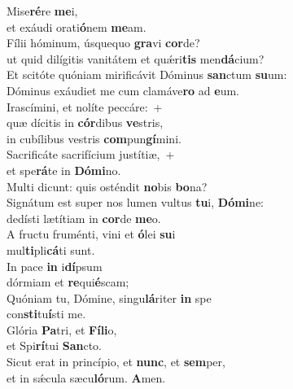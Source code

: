 \evenverse Mise\textbf{ré}re \textbf{me}i,~\*\\
\evenverse et exáudi orati\textbf{ó}nem \textbf{me}am.\\
\oddverse Fílii hóminum, úsquequo \textbf{gra}vi \textbf{cor}de?~\*\\
\oddverse ut quid dilígitis vanitátem et quǽri\textbf{tis} men\textbf{dá}cium?\\
\evenverse Et scitóte quóniam mirificávit Dóminus \textbf{san}ctum \textbf{su}um:~\*\\
\evenverse Dóminus exáudiet me cum clamáve\textbf{ro} ad \textbf{e}um.\\
\oddverse Irascímini, et nolíte peccáre:~+\\
\oddverse  quæ dícitis in \textbf{cór}dibus \textbf{ve}stris,~\*\\
\oddverse in cubílibus vestris \textbf{com}pun\textbf{gí}mini.\\
\evenverse Sacrificáte sacrifícium justítiæ,~+\\
\evenverse  et spe\textbf{rá}te in \textbf{Dó}\textbf{mi}no.~\*\\
\evenverse Multi dicunt: quis osténdit \textbf{no}bis \textbf{bo}na?\\
\oddverse Signátum est super nos lumen vultus \textbf{tu}i, \textbf{Dó}\textbf{mi}ne:~\*\\
\oddverse dedísti lætítiam in \textbf{cor}de \textbf{me}o.\\
\evenverse A fructu fruménti, vini et \textbf{ó}lei \textbf{su}i~\*\\
\evenverse mul\textbf{ti}pli\textbf{cá}ti sunt.\\
\oddverse In pace \textbf{in} i\textbf{dí}psum~\*\\
\oddverse dórmiam et \textbf{re}qui\textbf{é}scam;\\
\evenverse Quóniam tu, Dómine, singu\textbf{lá}riter \textbf{in} spe~\*\\
\evenverse con\textbf{sti}tu\textbf{í}sti me.\\
\oddverse Glória \textbf{Pa}tri, et \textbf{Fí}\textbf{li}o,~\*\\
\oddverse et Spi\textbf{rí}tui \textbf{San}cto.\\
\evenverse Sicut erat in princípio, et \textbf{nunc}, et \textbf{sem}per,~\*\\
\evenverse et in sǽcula sæcu\textbf{ló}rum. \textbf{A}men.\\

